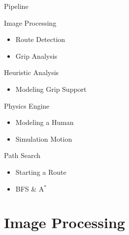 \documentclass{beamer}
\begin{document}
\begin{frame}[T]{Pipeline}

\pause

\begin{block}{Image Processing}
\begin{itemize}
 \item Route Detection
 \item Grip Analysis
\end{itemize}
\end{block}

\pause

\begin{block}{Heuristic Analysis}
\begin{itemize}
 \item Modeling Grip Support
\end{itemize}
\end{block}

\pause

\begin{block}{Physics Engine}
\begin{itemize}
 \item Modeling a Human
 \item Simulation Motion
\end{itemize}
\end{block}

\pause

\begin{block}{Path Search}
\begin{itemize}
 \item Starting a Route
 \item BFS \& A$^*$
\end{itemize}
\end{block}

\end{frame}


\section{Image Processing}
\end{document}
